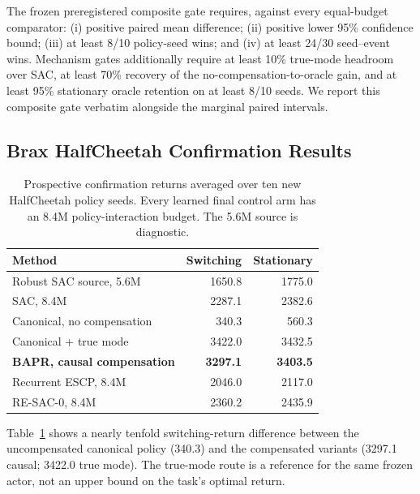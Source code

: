 \documentclass[twoside,11pt]{article}
\newcommand{\resacbaseline}{RE-SAC-0}
\begin{document}
The frozen preregistered composite gate requires, against every equal-budget comparator: (i) positive paired mean difference; (ii) positive lower 95\% confidence bound; (iii) at least 8/10 policy-seed wins; and (iv) at least 24/30 seed--event wins. Mechanism gates additionally require at least 10\% true-mode headroom over SAC, at least 70\% recovery of the no-compensation-to-oracle gain, and at least 95\% stationary oracle retention on at least 8/10 seeds. We report this composite gate verbatim alongside the marginal paired intervals.

\subsection{Brax HalfCheetah Confirmation Results}

\begin{table}[t]
\centering
\caption{Prospective confirmation returns averaged over ten new HalfCheetah policy seeds. Every learned final control arm has an 8.4M policy-interaction budget. The 5.6M source is diagnostic.}
\label{tab:v32_returns}
\begin{tabular}{lrr}
\toprule
Method & Switching & Stationary \\
\midrule
Robust SAC source, 5.6M & 1650.8 & 1775.0 \\
SAC, 8.4M & 2287.1 & 2382.6 \\
Canonical, no compensation & 340.3 & 560.3 \\
Canonical + true mode & 3422.0 & 3432.5 \\
\textbf{BAPR, causal compensation} & \textbf{3297.1} & \textbf{3403.5} \\
Recurrent ESCP, 8.4M & 2046.0 & 2117.0 \\
\resacbaseline{}, 8.4M & 2360.2 & 2435.9 \\
\bottomrule
\end{tabular}
\end{table}

Table~\ref{tab:v32_returns} shows a nearly tenfold switching-return difference between the uncompensated canonical policy (340.3) and the compensated variants (3297.1 causal; 3422.0 true mode). The true-mode route is a reference for the same frozen actor, not an upper bound on the task's optimal return.
\end{document}
